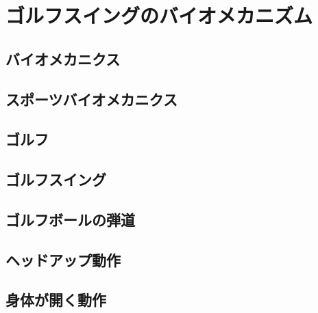\chapter{ゴルフスイングのバイオメカニズム}
\section{バイオメカニクス}
\section{スポーツバイオメカニクス}
\section{ゴルフ}
\section{ゴルフスイング}
\section{ゴルフボールの弾道}
\section{ヘッドアップ動作}
\section{身体が開く動作}
